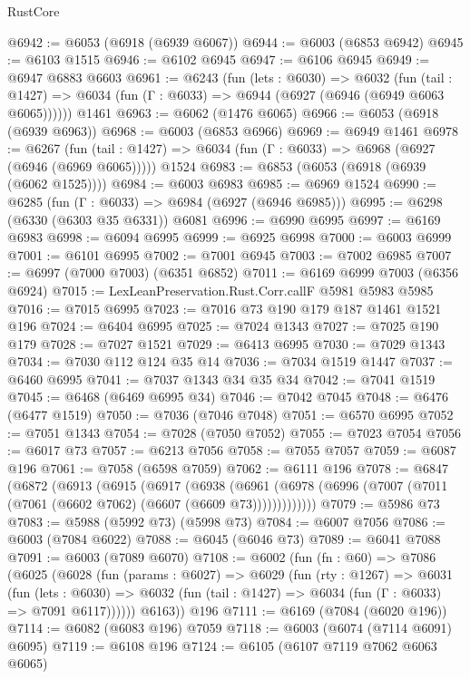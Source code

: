\begin{lexlean}{RustCore}
\begin{coremodule}
@6942 := @6053 (@6918 (@6939 @6067))
@6944 := @6003 (@6853 @6942)
@6945 := @6103 @1515
@6946 := @6102 @6945
@6947 := @6106 @6945
@6949 := @6947 @6883 @6603
@6961 := @6243
    (fun (lets : @6030) =>
    @6032
      (fun (tail : @1427) => @6034 (fun (Γ : @6033) => @6944 (@6927 (@6946 (@6949 @6063 @6065))))))
    @1461
@6963 := @6062 (@1476 @6065)
@6966 := @6053 (@6918 (@6939 @6963))
@6968 := @6003 (@6853 @6966)
@6969 := @6949 @1461
@6978 := @6267
    (fun (tail : @1427) => @6034 (fun (Γ : @6033) => @6968 (@6927 (@6946 (@6969 @6065)))))
    @1524
@6983 := @6853 (@6053 (@6918 (@6939 (@6062 @1525))))
@6984 := @6003 @6983
@6985 := @6969 @1524
@6990 := @6285 (fun (Γ : @6033) => @6984 (@6927 (@6946 @6985)))
@6995 := @6298 (@6330 (@6303 @35 @6331)) @6081
@6996 := @6990 @6995
@6997 := @6169 @6983
@6998 := @6094 @6995
@6999 := @6925 @6998
@7000 := @6003 @6999
@7001 := @6101 @6995
@7002 := @7001 @6945
@7003 := @7002 @6985
@7007 := @6997 (@7000 @7003) (@6351 @6852)
@7011 := @6169 @6999 @7003 (@6356 @6924)
@7015 := LexLeanPreservation.Rust.Corr.callF @5981 @5983 @5985
@7016 := @7015 @6995
@7023 := @7016 @73 @190 @179 @187 @1461 @1521 @196
@7024 := @6404 @6995
@7025 := @7024 @1343
@7027 := @7025 @190 @179
@7028 := @7027 @1521
@7029 := @6413 @6995
@7030 := @7029 @1343
@7034 := @7030 @112 @124 @35 @14
@7036 := @7034 @1519 @1447
@7037 := @6460 @6995
@7041 := @7037 @1343 @34 @35 @34
@7042 := @7041 @1519
@7045 := @6468 (@6469 @6995 @34)
@7046 := @7042 @7045
@7048 := @6476 (@6477 @1519)
@7050 := @7036 (@7046 @7048)
@7051 := @6570 @6995
@7052 := @7051 @1343
@7054 := @7028 (@7050 @7052)
@7055 := @7023 @7054
@7056 := @6017 @73
@7057 := @6213 @7056
@7058 := @7055 @7057
@7059 := @6087 @196
@7061 := @7058 (@6598 @7059)
@7062 := @6111 @196
@7078 := @6847
    (@6872
      (@6913
        (@6915
          (@6917
            (@6938
              (@6961 (@6978 (@6996 (@7007 (@7011 (@7061 (@6602 @7062) (@6607 (@6609 @73)))))))))))))
@7079 := @5986 @73
@7083 := @5988 (@5992 @73) (@5998 @73)
@7084 := @6007 @7056
@7086 := @6003 (@7084 @6022)
@7088 := @6045 (@6046 @73)
@7089 := @6041 @7088
@7091 := @6003 (@7089 @6070)
@7108 := @6002
    (fun (fn : @60) =>
    @7086
      (@6025
        (@6028
          (fun (params : @6027) =>
          @6029
            (fun (rty : @1267) =>
            @6031
              (fun (lets : @6030) =>
              @6032 (fun (tail : @1427) => @6034 (fun (Γ : @6033) => @7091 @6117))))))
        @6163))
    @196
@7111 := @6169 (@7084 (@6020 @196))
@7114 := @6082 (@6083 @196) @7059
@7118 := @6003 (@6074 (@7114 @6091) @6095)
@7119 := @6108 @196
@7124 := @6105 (@6107 @7119 @7062 @6063 @6065)

\end{coremodule}
\end{lexlean}
